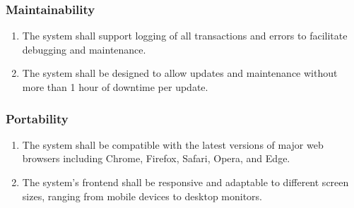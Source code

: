 \subsubsection{Maintainability}
\begin{enumerate}[resume]
    \item The system shall support logging of all transactions and errors to facilitate debugging and maintenance.
    \item The system shall be designed to allow updates and maintenance without more than 1 hour of downtime per update.
\end{enumerate}

\subsubsection{Portability}
\begin{enumerate}[resume]
    \item The system shall be compatible with the latest versions of major web browsers including Chrome, Firefox, Safari, Opera, and Edge.
    \item The system's frontend shall be responsive and adaptable to different screen sizes, ranging from mobile devices to desktop monitors.
\end{enumerate}



